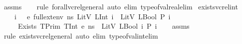 \begin{isabellebody}
\isamarkupfalse%
\ assms\isanewline
\ \ \isamarkupfalse%
\ {\isacharparenleft}{\kern0pt}rule\ forall{\isacharunderscore}{\kern0pt}vc{\isacharunderscore}{\kern0pt}rel{\isacharunderscore}{\kern0pt}general{\isacharcomma}{\kern0pt}\ auto\ elim{\isacharcolon}{\kern0pt}\ type{\isacharunderscore}{\kern0pt}of{\isacharunderscore}{\kern0pt}val{\isacharunderscore}{\kern0pt}real{\isacharunderscore}{\kern0pt}elim{\isacharparenright}{\kern0pt}%
\endisatagproof
{\isafoldproof}%
%
\isadelimproof
\isanewline
%
\endisadelimproof
\isanewline
{}\isamarkupfalse%
\ exists{\isacharunderscore}{\kern0pt}vc{\isacharunderscore}{\kern0pt}rel{\isacharunderscore}{\kern0pt}int{\isacharcolon}{\kern0pt}\isanewline
\ \ \ {\isachardoublequoteopen}{\isasymAnd}\ i{\isachardot}{\kern0pt}\ {\isasymLambda}{\isacharcomma}{\kern0pt}{\isasymGamma}{\isacharcomma}{\kern0pt}{\isasymOmega}\ {\isasymturnstile}\ {\isasymlangle}e{\isacharcomma}{\kern0pt}\ full{\isacharunderscore}{\kern0pt}ext{\isacharunderscore}{\kern0pt}env\ ns\ {\isacharparenleft}{\kern0pt}LitV\ {\isacharparenleft}{\kern0pt}LInt\ i{\isacharparenright}{\kern0pt}{\isacharparenright}{\kern0pt}{\isasymrangle}\ {\isasymDown}\ LitV\ {\isacharparenleft}{\kern0pt}LBool\ {\isacharparenleft}{\kern0pt}P\ i{\isacharparenright}{\kern0pt}{\isacharparenright}{\kern0pt}{\isachardoublequoteclose}\isanewline
\ \ \ {\isachardoublequoteopen}{\isasymLambda}{\isacharcomma}{\kern0pt}{\isasymGamma}{\isacharcomma}{\kern0pt}{\isasymOmega}\ {\isasymturnstile}\ {\isasymlangle}Exists\ {\isacharparenleft}{\kern0pt}TPrim\ TInt{\isacharparenright}{\kern0pt}\ e{\isacharcomma}{\kern0pt}\ ns{\isasymrangle}\ {\isasymDown}\ LitV\ {\isacharparenleft}{\kern0pt}LBool\ {\isacharparenleft}{\kern0pt}{\isasymexists}i{\isachardot}{\kern0pt}\ P\ i{\isacharparenright}{\kern0pt}{\isacharparenright}{\kern0pt}{\isachardoublequoteclose}\isanewline
%
\isadelimproof
\ \ %
\endisadelimproof
%
\isatagproof
{}\isamarkupfalse%
\ assms\isanewline
\ \ \isamarkupfalse%
\ {\isacharparenleft}{\kern0pt}rule\ exists{\isacharunderscore}{\kern0pt}vc{\isacharunderscore}{\kern0pt}rel{\isacharunderscore}{\kern0pt}general{\isacharcomma}{\kern0pt}\ auto\ elim{\isacharcolon}{\kern0pt}\ type{\isacharunderscore}{\kern0pt}of{\isacharunderscore}{\kern0pt}val{\isacharunderscore}{\kern0pt}int{\isacharunderscore}{\kern0pt}elim{\isacharparenright}{\kern0pt}%
\endisatagproof
{\isafoldproof}%
%
\isadelimproof
\isanewline
%
\endisadelimproof
\isanewline
{}\isamarkupfalse%

\end{isabellebody}
